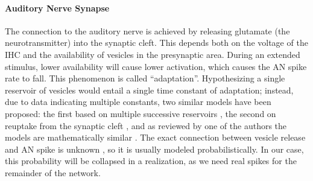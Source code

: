 \documentclass[11pt,a4paper]{article}
\newcommand{\parspace}{\vspace{7pt}}
\begin{document}
\paragraph{Auditory Nerve Synapse}
The connection to the auditory nerve is achieved by releasing glutamate (the neurotransmitter) into the synaptic cleft. This depends both on the voltage of the IHC and the availability of vesicles in the presynaptic area. During an extended stimulus, lower availability will cause lower activation, which causes the AN spike rate to fall. This phenomenon is called ``adaptation''. Hypothesizing a single reservoir of vesicles would entail a single time constant of adaptation; instead, due to data indicating multiple constants, two similar models have been proposed: the first based on multiple successive reservoirs \cite{carneyModelResponsesLowfrequency1993}, the second on reuptake from the synaptic cleft \cite{meddisAuditorynerveFirstspikeLatency2006}, and as reviewed by one of the authors the models are mathematically similar \cite{zhangAnalysisModelsSynapse2005}. The exact connection between vesicle release and AN spike is unknown \cite{meddisAuditoryPeripheryPinna2010}, so it is usually modeled probabilistically. In our case, this probability will be collapsed in a realization, as we need real spikes for the remainder of the network.
\parspace
\end{document}
